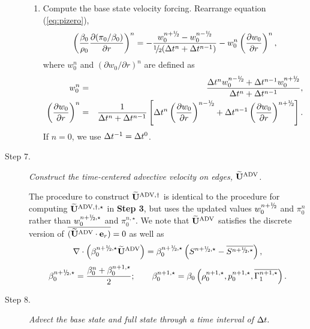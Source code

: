 \begin{description}
\begin{enumerate}
\item Compute the base state velocity forcing.  Rearrange equation (\ref{eq:pizero}),
\begin{equation}
\left ( \frac{\beta_0}{\rho_0} \frac{\partial (\pi_0/\beta_0)}{\partial r} \right )^n = 
-\frac{w_0^{\nph} - w_0^\nmh}{\myhalf(\dt^n+\dt^{n-1})} 
- w_0^n \left(\frac{\partial w_0}{\partial r}\right)^n,
\end{equation}
  where $w_0^{n}$ and $(\partial w_0 / \partial r)^{n}$ are defined as
\begin{eqnarray}
w_0^n &=& \frac{\dt^{n} w_0^{\nmh} + \dt^{n-1} w_0^{\nph}}{\dt^n+\dt^{n-1}}, \\
\left(\frac{\partial w_0}{\partial r}\right)^{n} &=& \frac{1}{\dt^n+\dt^{n-1} } \left [ \dt^{n} \left(\frac{\partial w_0 }{ \partial r}\right)^{\nmh} + \dt^{n-1} \left(\frac{\partial w_0 }{ \partial r}\right)^{\nph} \right ].\nonumber \\
\end{eqnarray}
  If $n=0$, we use $\Delta t^{-1} = \Delta t^0$.

\end{enumerate}

\item[Step 7.] {\em Construct the time-centered advective velocity on edges, $\widetilde{\mathbf{U}}^{\mathrm{ADV}}$.}

The procedure to construct $\widetilde{{\bf U}}^{\mathrm{ADV},\dagger}$ is identical to the procedure
for computing $\widetilde{{\bf U}}^{\mathrm{ADV},\dagger,\star}$ in {\bf Step 3}, but uses 
the updated values $w_0^{\nph}$ and $\pi_0^n$ rather than $w_0^{\nph,\star}$ 
and $\pi_0^{n,\star}$.  We note that $\widetilde{\mathbf{U}}^{\mathrm{ADV}}$ satisfies the discrete version of
$\overline{(\widetilde{\mathbf{U}}^{\mathrm{ADV}}\cdot{\bf e}_r)}=0$ as well as
\begin{equation}
\nabla \cdot \left(\beta_0^{\nph,\star} \uadvtwo\right) =
\beta_0^{\nph,\star}\left(S^{\nph,\star} - \overline{S^{\nph,\star}}\right),
\end{equation}
\begin{equation}
\beta_0^{\nph,\star} = \frac{ \beta_0^n +  \beta_0^{n+1,\star} }{2};
\qquad
 \beta_0^{n+1,\star} = \beta_0 \left(\rho_0^{n+1,\star}, p_0^{n+1,\star}, \overline{\Gamma_1^{n+1,\star}}\right).
\end{equation}

\item[Step 8.] {\em Advect the base state and full state through a time interval of $\Delta t.$}


\end{description}
